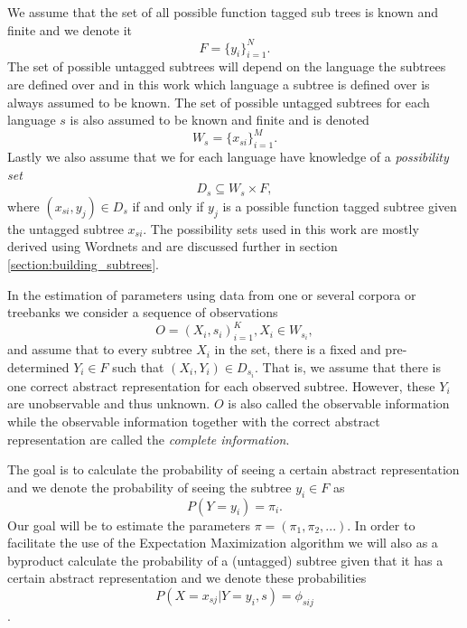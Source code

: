 We assume that the set of all possible function tagged sub trees is known and finite and we denote it
\begin{equation*}
    F=\{y_i\}_{i=1}^N.
\end{equation*}
The set of possible untagged subtrees will depend on the language the subtrees are defined over and in this work which language a subtree is defined over is always assumed to be known. The set of possible untagged subtrees for each language $s$ is also assumed to be known and finite and is denoted
\begin{equation*}
    W_s=\{x_{si}\}_{i=1}^M.
\end{equation*}
Lastly we also assume that we for each language have knowledge of a \emph{possibility set}
\begin{equation*}
D_s\subseteq W_s \times F,
\end{equation*}
where $(x_{si},y_j)\in D_s$ if and only if $y_j$ is a possible function tagged subtree given the untagged subtree $x_{si}$. The possibility sets used in this work are mostly derived using Wordnets and are discussed further in section \ref{section:building_subtrees}. %

In the estimation of parameters using data from one or several corpora or treebanks we consider a sequence of observations \begin{equation*}
    O=(X_i, s_i)_{i=1}^K, X_i\in W_{s_i},
\end{equation*}
and assume that to every subtree $X_i$ in the set, there is a fixed and pre-determined $Y_i\in F$ such that $(X_i,Y_i)\in D_{s_i}$. That is, we assume that there is one correct abstract representation for each observed subtree. However, these $Y_i$ are unobservable and thus unknown. $O$ is also called the observable information while the observable information together with the correct abstract representation are called the \emph{complete information}.

The goal is to calculate the probability of seeing a certain abstract representation and we denote the probability of seeing the subtree $y_i\in F$ as
\begin{equation*}
    P(Y=y_i)=\pi_i.
\end{equation*}
Our goal will be to estimate the parameters $\pi=(\pi_1, \pi_2,...)$. In order to facilitate the use of the Expectation Maximization algorithm we will also as a byproduct calculate the probability of a (untagged) subtree given that it has a certain abstract representation and we denote these probabilities 
\begin{equation*}
    P(X=x_{sj} | Y=y_i, s) = \phi_{sij}
\end{equation*}. 

